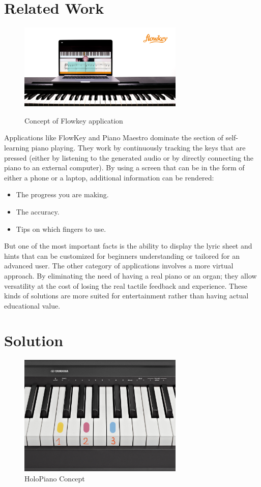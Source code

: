 \documentclass[12 pct]{report}
\begin{document}
\section{Related Work}
\begin{figure}[H]
\includegraphics[width=0.7\textwidth]{flowkey}
\centering
\label{fig:hololens}
\caption{Concept of Flowkey application}
\end{figure}

Applications like FlowKey and Piano Maestro \cite{ng2015easy} dominate the section of self-learning piano playing. 
They work by continuously tracking the keys that are pressed (either by listening to the generated audio or by directly connecting the piano to an external computer). 
By using a screen that can be in the form of either a phone or a laptop, additional information can be rendered: 
\begin{itemize}
\item The progress you are making.
\item The accuracy. 
\item Tips on which fingers to use.
\end{itemize} 
But one of the most important facts is the ability to display the lyric sheet and hints that can be customized for beginners understanding or tailored for an advanced user. 
The other category of applications involves a more virtual approach. 
By eliminating the need of having a real piano or an organ; they allow versatility at the cost of losing the real tactile feedback and experience. 
These kinds of solutions are more suited for entertainment rather than having actual educational value.

\section{Solution}
\begin{figure}[H]
\includegraphics[width=0.7\textwidth]{piano}
\centering
\caption{HoloPiano Concept}
\label{fig:hpconcept}
\end{figure}
\end{document}
